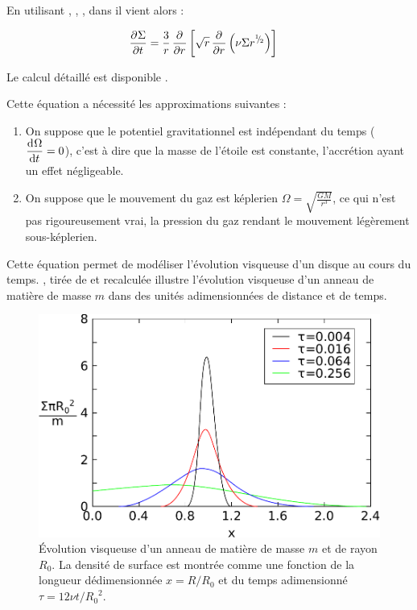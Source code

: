 \bigskip

En utilisant , , , dans  il vient alors :
\begin{important}
\begin{align}
\mathinner{ \dfrac{\partial{^{}}\Sigma}{\partial{{t}^{}}} } &=\frac{3}{r}\mathinner{ \dfrac{\partial{^{}}}{\partial{{r}^{}}} }\left[\sqrt{r} \mathinner{ \dfrac{\partial{^{}}}{\partial{{r}^{}}} }\left(\nu \Sigma r^{{}^{1\!\!}/ _{\!2}}\right)\right]
\end{align}
\end{important}

Le calcul détaillé est disponible .

Cette équation a nécessité les approximations suivantes : 
\begin{enumerate}
\item On suppose que le potentiel gravitationnel est indépendant du temps ($\mathinner{ \dfrac{\operatorname{d \!}{^{}}\Omega}{\operatorname{d \!}{{t}^{}}} }=0$), c'est à dire que la masse de l'étoile est constante, l'accrétion ayant un effet négligeable.
\item On suppose que le mouvement du gaz est képlerien $\Omega=\sqrt{\frac{GM}{r^3}}$, ce qui n'est pas rigoureusement vrai, la pression du gaz rendant le mouvement légèrement sous-képlerien.
\end{enumerate}

Cette équation permet de modéliser l'évolution visqueuse d'un disque au cours du temps. , tirée de \cite{pringle1981accretion} et recalculée illustre l'évolution visqueuse d'un anneau de matière de masse $m$ dans des unités adimensionnées de distance et de temps.

\begin{figure}[htb]
\centering
\includegraphics[width=0.45\linewidth]{figure/pringle_viscous_dissipation.pdf}
\caption{Évolution visqueuse d'un anneau de matière de masse $m$ et de rayon $R_0$. La densité de surface est montrée comme une fonction de la longueur dédimensionnée $x=R/R_0$ et du temps adimensionné $\tau=12\nu t / {R_0}^2$.}\label{fig:pringle_viscous_dissipation}
\end{figure}



